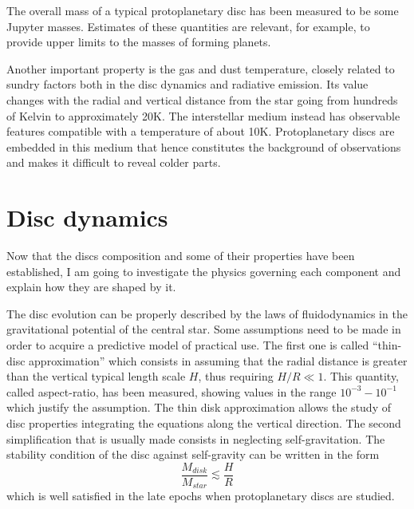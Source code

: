\documentclass[a4paper,10pt]{report}
\begin{document}
The overall mass of a typical protoplanetary disc has been measured to be some Jupyter masses.
Estimates of these quantities are relevant, for example, to provide upper limits
to the masses of forming planets.

Another important property is the gas and dust temperature, closely related to sundry factors both in the disc dynamics and radiative emission.
Its value changes with the radial and vertical distance from the star going from hundreds of Kelvin to approximately 20K.
The interstellar medium instead has observable features compatible with a temperature of about 10K. Protoplanetary discs are embedded in this medium 
that hence constitutes the background of observations and makes it difficult to reveal colder parts.

\section{Disc dynamics}

Now that the discs composition and some of their properties have been established, I am going 
to investigate the physics governing each component and explain how they are shaped by it.

The disc evolution can be properly described by the laws of fluidodynamics in the gravitational potential of the central star.
Some assumptions need to be made in order to acquire a predictive model of practical use.
The first one is called ``thin-disc approximation'' which consists in assuming that the radial distance is greater than 
the vertical typical length scale $H$, thus requiring $H/R \ll 1$. This quantity, called aspect-ratio, has been measured, 
showing values in the range $10^{-3}-10^{-1}$ which justify the assumption. The thin disk approximation allows the study of disc properties integrating
the equations along the vertical direction.
The second simplification that is usually made consists in neglecting self-gravitation.
The stability condition of the disc against self-gravity can be written in the form
\begin{equation}
    \frac{M_{disk}}{M_{star}} \lesssim  \frac{H}{R}
\end{equation}
which is well satisfied in the late epochs when protoplanetary discs are studied.
\end{document}
